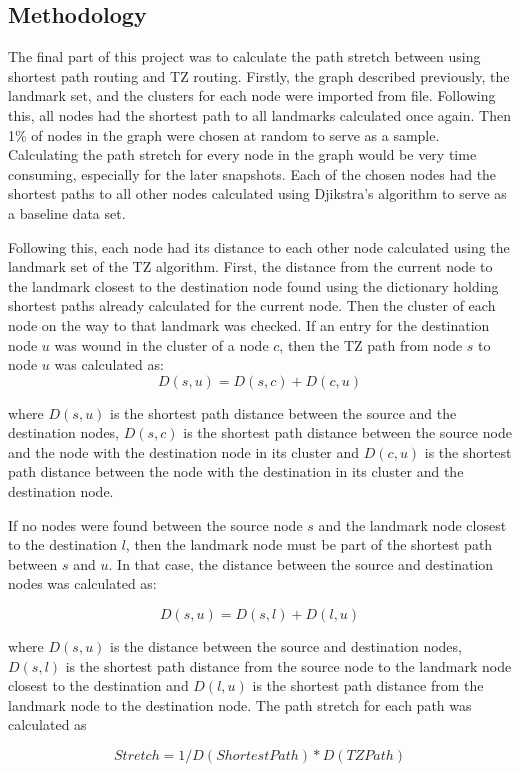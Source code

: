 \documentclass{dissertation/mpaper}
\begin{document}
\subsection{Methodology}
The final part of this project was to calculate the path stretch between using shortest path routing and TZ routing. Firstly, the graph described previously, the landmark set, and the clusters for each node were imported from file. Following this, all nodes had the shortest path to all landmarks calculated once again. Then 1\% of nodes in the graph were chosen at random to serve as a sample. Calculating the path stretch for every node in the graph would be very time consuming, especially for the later snapshots. Each of the chosen nodes had the shortest paths to all other nodes calculated using Djikstra's algorithm to serve as a baseline data set. 

Following this, each node had its distance to each other node calculated using the landmark set of the TZ algorithm. First, the distance from the current node to the landmark closest to the destination node found using the dictionary holding shortest paths already calculated for the current node. Then the cluster of each node on the way to that landmark was checked. If an entry for the destination node $u$ was wound in the cluster of a node $c$, then the TZ path from node $s$ to node $u$ was calculated as:
\[ D(s,u) = D(s,c) + D(c,u)\]

where $D(s,u)$ is the shortest path distance between the source and the destination nodes, $D(s,c)$ is the shortest path distance between the source node and the node with the destination node in its cluster and $D(c,u)$ is the shortest path distance between the node with the destination in its cluster and the destination node.

If no nodes were found between the source node $s$ and the landmark node closest to the destination $l$, then the landmark node must be part of the shortest path between $s$ and $u$. In that case, the distance between the source and destination nodes was calculated as:

\[ D(s,u) = D(s,l) + D(l,u)\]

where $D(s,u)$ is the distance between the source and destination nodes, $D(s,l)$ is the shortest path distance from the source node to the landmark node closest to the destination and $D(l,u)$ is the shortest path distance from the landmark node to the destination node. The path stretch for each path was calculated as 

\[ Stretch = 1 / D(Shortest Path) * D(TZ Path)\]
\end{document}
